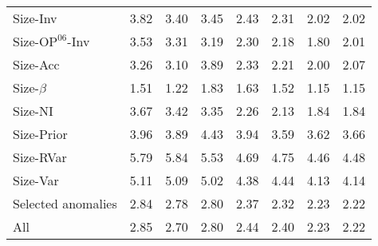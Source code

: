 \begin{table}[!ht]
\begin{tabular}{lrrrrrrr}
  
    
    
    Size-Inv  & 3.82  & 3.40  & 3.45  & 2.43  & 2.31  & 2.02  & 2.02  \\
    
  
    
    
    Size-$\text{OP}^{06}$-Inv  & 3.53  & 3.31  & 3.19  & 2.30  & 2.18  & 1.80  & 2.01  \\
    
  
    
    
    Size-Acc  & 3.26  & 3.10  & 3.89  & 2.33  & 2.21  & 2.00  & 2.07  \\
    
  
    
    
    Size-$\beta$  & 1.51  & 1.22  & 1.83  & 1.63  & 1.52  & 1.15  & 1.15  \\
    
  
    
    
    Size-NI  & 3.67  & 3.42  & 3.35  & 2.26  & 2.13  & 1.84  & 1.84  \\
    
  
    
    
    Size-Prior  & 3.96  & 3.89  & 4.43  & 3.94  & 3.59  & 3.62  & 3.66  \\
    
  
    
    
    Size-RVar  & 5.79  & 5.84  & 5.53  & 4.69  & 4.75  & 4.46  & 4.48  \\
    
  
    
    
    Size-Var  & 5.11  & 5.09  & 5.02  & 4.38  & 4.44  & 4.13  & 4.14  \\
    
  
    
    
    Selected anomalies  & 2.84  & 2.78  & 2.80  & 2.37  & 2.32  & 2.23  & 2.22  \\
    [1em]
  
    
    
    All  & 2.85  & 2.70  & 2.80  & 2.44  & 2.40  & 2.23  & 2.22  \\
    
  
  \bottomrule
\end{tabular}
\label{tbl:GRS}
\end{table}
